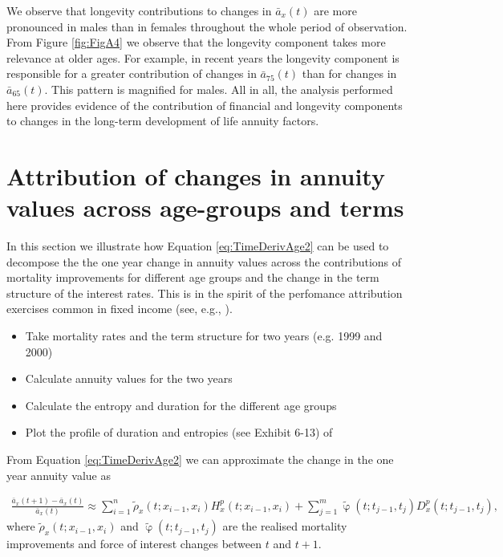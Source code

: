\documentclass[12pt]{article}
\begin{document}
 
We observe that longevity contributions to changes in $\bar{a}_x(t)$ are more pronounced in males than in females throughout the whole period of observation. From Figure \ref{fig:FigA4} we observe that the longevity component takes more relevance at older ages. For example, in recent years the longevity component is responsible for a greater contribution of changes in $\bar{a}_{75}(t)$ than for changes in $\bar{a}_{65}(t)$. This pattern is magnified for males. All in all, the analysis performed here provides evidence of the contribution of financial and longevity components to changes in the long-term development of life annuity factors.











\FloatBarrier
\section{Attribution of changes in annuity values across age-groups and terms}

In this section we illustrate how Equation \ref{eq:TimeDerivAge2} can be used to decompose the the one year change in annuity values across the contributions of mortality improvements for different age groups and the change in the term structure of the interest rates. This is in the spirit of the perfomance attribution exercises common in fixed income (see, e.g., \citep{Daul2012}). 

\begin{itemize}
\item Take mortality rates and the term structure for two years (e.g. 1999 and 2000)     
\item  Calculate annuity values for the two years
\item  Calculate the entropy and duration for the different age groups
\item  Plot the profile of duration and entropies (see Exhibit 6-13) of \citep{Ho1992}

\end{itemize}

From Equation \ref{eq:TimeDerivAge2} we can approximate the change in the one year annuity value as 

\begin{equation}\label{eq:ChangeApprox2}
\begin{split}
 \frac{\bar{a}_x(t+1) - \bar{a}_x(t)}{\bar{a}_x(t)} \approx \sum_{i=1}^n\tilde{\rho}_x(t;x_{i-1}, x_i){H}^{p}_x(t;x_{i-1}, x_i) +\sum_{j=1}^m\tilde{\upvarphi}(t;t_{j-1},t_{j}){D}^{p}_x(t;t_{j-1},t_{j}),  
\end{split}
\end{equation} 
 where $\tilde{\rho}_x(t;x_{i-1}, x_i)$ and $\tilde{\upvarphi}(t;t_{j-1},t_{j})$ are the realised mortality improvements and force of interest changes between $t$ and $t+1$.
\end{document}
